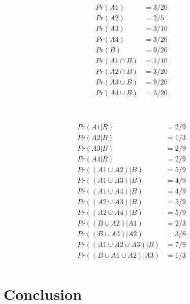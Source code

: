 \documentclass[a4paper,12pt]{article}
\begin{document}
\begin{align*}
Pr(A1) &= 3/20 \\
Pr(A2) &= 2/5 \\
Pr(A3) &= 3/10 \\
Pr(A4) &= 3/20 \\
Pr(B) &= 9/20 \\
Pr(A1\cap B) &= 1/10 \\
Pr(A2\cap B) &= 3/20 \\
Pr(A3\cup B) &= 9/20 \\
Pr(A4\cup B) &= 3/20 \\
\end{align*}

\section{}

\begin{align*}
Pr(A1 | B) &= 2/9 \\
Pr(A2 | B) &= 1/3 \\
Pr(A3 | B) &= 2/9 \\
Pr(A4 | B) &= 2/9 \\
Pr( (A1 \cup A2) | B) &= 5/9 \\
Pr( (A1 \cup A3) | B) &= 4/9 \\
Pr( (A1 \cup A4) | B) &= 4/9 \\
Pr( (A2 \cup A3) | B) &= 5/9 \\
Pr( (A2 \cup A4) | B) &= 5/9 \\
Pr( (B \cup A2) | A1) &= 2/3 \\
Pr( (B \cup A3) | A2) &= 3/8 \\
Pr( (A1 \cup A2 \cup A3) | B) &= 7/9 \\
Pr( (B \cup A1 \cup A2) | A3) &= 1/3 \\
\end{align*}

\section{Conclusion}
\end{document}
